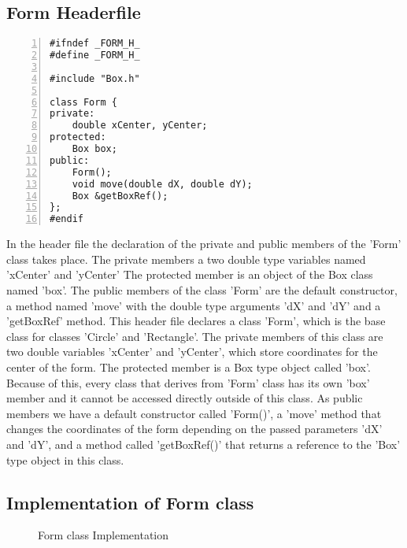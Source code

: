\documentclass{article}
\begin{document}
\subsection{Form Headerfile}
\begin{lstlisting}[basicstyle=\footnotesize\ttfamily, numbers=left, stepnumber=1, numberstyle = \normalsize]
#ifndef _FORM_H_
#define _FORM_H_

#include "Box.h"

class Form {
private:
	double xCenter, yCenter;  
protected:	
	Box box; 	
public:
	Form();
	void move(double dX, double dY);	
	Box &getBoxRef();
};
#endif
\end{lstlisting}
\normalsize{In the header file the declaration of the private and public members of the 'Form' class takes place. The private members a two double type variables named 'xCenter' and 'yCenter' The protected member is an object of the Box class named 'box'. The public members of the class 'Form' are the default constructor, a method named 'move' with the double type arguments 'dX' and 'dY' and a 'getBoxRef' method.\newline
\newline
This header file declares a class 'Form', which is the base class for classes 'Circle' and 'Rectangle'. The private members of this class are two double variables 'xCenter' and 'yCenter', which store coordinates for the center of the form.
The protected member is a Box type object called 'box'. Because of this, every class that derives from 'Form' class has its own 'box' member and it cannot be accessed directly outside of this class. 
As public members we have a default constructor called 'Form()', a 'move' method that changes the coordinates of the form depending on the passed parameters 'dX' and 'dY', and a method called 'getBoxRef()' that returns a reference to the 'Box' type object in this class.

}\newpage%
\subsection{Implementation of Form class}
\begin{figure}
\scriptsize{\caption{Form class Implementation}}
\end{figure}
\end{document}
